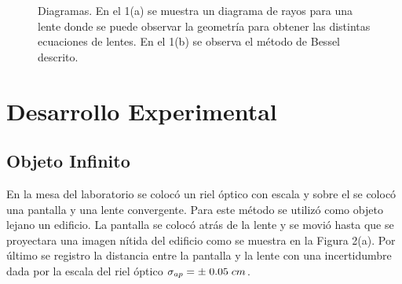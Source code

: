 \documentclass[DIV=calc, paper=a4, fontsize=10pt]{scrartcl}
\begin{document}
\begin{figure}[H]
    \centering
 \caption{Diagramas. En el 1(a) se muestra un diagrama de rayos para una lente donde se puede observar la geometría para obtener las distintas ecuaciones de lentes. En el 1(b) se observa el método de Bessel descrito.}
 \label{f:Desarrollo experimental}
\end{figure}
\section*{\textcolor{carmine}{Desarrollo Experimental}}
\subsection*{\textcolor{carmine}{Objeto Infinito}}
En la mesa del laboratorio se colocó un riel óptico con escala y sobre el se colocó una pantalla y una lente convergente. Para este método se utilizó como objeto lejano un edificio. La pantalla se colocó atrás de la lente y se movió hasta que se proyectara una imagen nítida del edificio como se muestra en la Figura 2(a). Por último se registro la distancia entre la pantalla y la lente con una incertidumbre dada por la escala del riel óptico $\sigma_{ap}=\pm\hspace{0.1cm}0.05\hspace{0.1cm}cm$.
\end{document}
